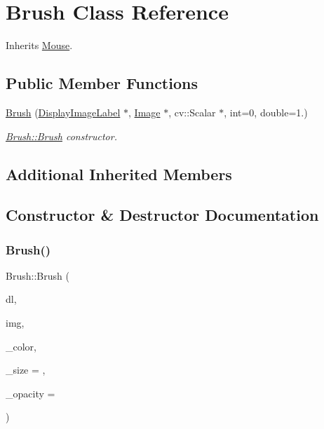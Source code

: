 \hypertarget{class_brush}{}\section{Brush Class Reference}
\label{class_brush}


Inherits \mbox{\hyperlink{class_mouse}{Mouse}}.

\subsection*{Public Member Functions}
\begin{DoxyCompactItemize}
\item 
\mbox{\hyperlink{class_brush_acc0a47bae9c3301b5f419a9681ab6479}{Brush}} (\mbox{\hyperlink{class_display_image_label}{Display\+Image\+Label}} $\ast$, \mbox{\hyperlink{class_image}{Image}} $\ast$, cv\+::\+Scalar $\ast$, int=0, double=1.)
\begin{DoxyCompactList}\small\item\em \mbox{\hyperlink{class_brush_acc0a47bae9c3301b5f419a9681ab6479}{Brush\+::\+Brush}} constructor. \end{DoxyCompactList}\end{DoxyCompactItemize}
\subsection*{Additional Inherited Members}


\subsection{Constructor \& Destructor Documentation}
\mbox{\label{class_brush_acc0a47bae9c3301b5f419a9681ab6479}} 
\subsubsection{\texorpdfstring{Brush()}{Brush()}}
{\footnotesize\ttfamily Brush\+::\+Brush (\begin{DoxyParamCaption}\item[{\mbox{\hyperlink{class_display_image_label}{Display\+Image\+Label}} $\ast$}]{dl,  }\item[{\mbox{\hyperlink{class_image}{Image}} $\ast$}]{img,  }\item[{cv\+::\+Scalar $\ast$}]{\+\_\+color,  }\item[{int}]{\+\_\+size = {},  }\item[{double}]{\+\_\+opacity = {} }\end{DoxyParamCaption})}



